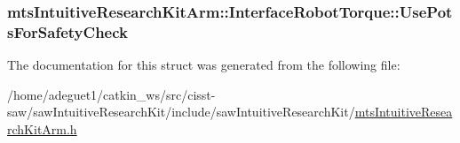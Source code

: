 \hypertarget{structmts_intuitive_research_kit_arm_1_1_interface_robot_torque_a33c894c1024853e9cbc7f496b2e05199}{
\subsubsection[{Use\-Pots\-For\-Safety\-Check}]{ mts\-Intuitive\-Research\-Kit\-Arm\-::\-Interface\-Robot\-Torque\-::\-Use\-Pots\-For\-Safety\-Check}}\label{structmts_intuitive_research_kit_arm_1_1_interface_robot_torque_a33c894c1024853e9cbc7f496b2e05199}


The documentation for this struct was generated from the following file\-:\begin{DoxyCompactItemize}
\item 
/home/adeguet1/catkin\-\_\-ws/src/cisst-\/saw/saw\-Intuitive\-Research\-Kit/include/saw\-Intuitive\-Research\-Kit/\hyperlink{mts_intuitive_research_kit_arm_8h}{mts\-Intuitive\-Research\-Kit\-Arm.\-h}\end{DoxyCompactItemize}
